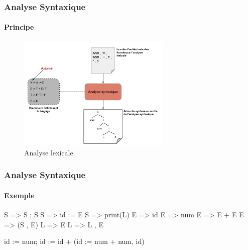 \documentclass{beamer}
\begin{document}
\begin{frame}\frametitle{Analyse Syntaxique}\framesubtitle{Principe}

	\begin{figure}[h]
		\centering
			\includegraphics[width=0.65\textwidth]{AnalyseSyntaxique.png}
		\caption{Analyse lexicale}
		\label{fig:AnalyseLexicale}
	\end{figure}\FloatBarrier

\end{frame}

\begin{frame}\frametitle{Analyse Syntaxique}\framesubtitle{Exemple}

	S => S ; S\newline
	S => id := E\newline
	S => print(L)\newline
	E => id\newline
	E => num\newline
	E => E + E\newline
	E => (S , E)\newline
	L => E\newline
	L => L , E\newline\newline

	id := num; id := id + (id := num + num, id)

\end{frame}
\end{document}

